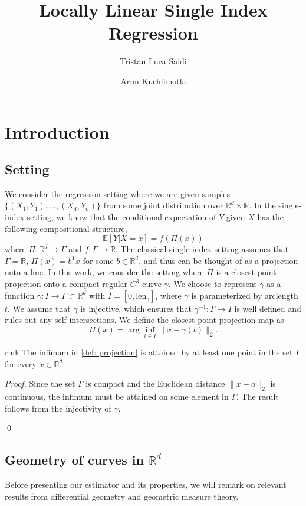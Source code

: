 \documentclass[11pt]{article}
\title{Locally Linear Single Index Regression}
\author{Tristan Luca Saidi}
\author{Arun Kuchibhotla}
\affil[1]{Department of Statistics and Data Science, Carnegie Mellon University}
\begin{document}
\maketitle

\section{Introduction}
\subsection{Setting}
We consider the regression setting where we are given samples $\{(X_1, Y_1), \dots, (X_d, Y_n)\}$ from some joint distribution over $\mathbb{R}^d\times \mathbb{R}$. In the single-index setting, we know that the conditional expectation of $Y$ given $X$ has the following compositional structure,
\[\mathbb{E}[Y | X = x] = f(\Pi(x))\]
where $\Pi:\mathbb{R}^d \rightarrow \Gamma$ and $f: \Gamma\rightarrow\mathbb{R}$. The classical single-index setting assumes that $\Gamma = \mathbb{R}$, $\Pi(x) = b^{T}x$ for some $b \in \mathbb{R}^d$, and thus can be thought of as a projection onto a line. In this work, we consider the setting where $\Pi$ is a closest-point projection onto a compact regular $C^3$ curve $\gamma$. We choose to represent $\gamma$ as a function $\gamma:I \rightarrow \Gamma \subset \mathbb{R}^d$ with $I = [0,\text{len}_{\gamma}]$, where $\gamma$ is parameterized by arclength $t$. We assume that $\gamma$ is injective, which ensures that $\gamma^{-1}:\Gamma\rightarrow I$ is well defined and rules out any self-intersections. We define the closest-point projection map as
\begin{equation}\label{def: projection}
\Pi(x) = \arg\inf_{t\in I}\|x - \gamma(t)\|_2.
\end{equation}
\begin{restatable}{rmk}{} \label{remark: infimum}
    The infimum in \cref{def: projection} is attained by at least one point in the set $I$ for every $x \in \mathbb{R}^d$.
\end{restatable}
\noindent \textit{Proof.} Since the set $\Gamma$ is compact and the Euclidean distance $\|x-a\|_2$ is continuous, the infimum must be attained on some element in $\Gamma$. The result follows from the injectivity of $\gamma$. 

\qed{}

\subsection{Geometry of curves in $\mathbb{R}^d$}
Before presenting our estimator and its properties, we will remark on relevant results from differential geometry and geometric measure theory. 
\end{document}
